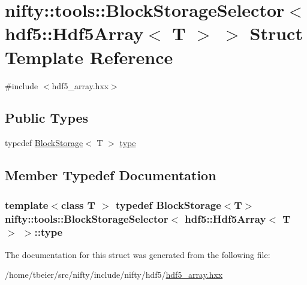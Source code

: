 \hypertarget{structnifty_1_1tools_1_1BlockStorageSelector_3_01hdf5_1_1Hdf5Array_3_01T_01_4_01_4}{}\section{nifty\+:\+:tools\+:\+:Block\+Storage\+Selector$<$ hdf5\+:\+:Hdf5\+Array$<$ T $>$ $>$ Struct Template Reference}
\label{structnifty_1_1tools_1_1BlockStorageSelector_3_01hdf5_1_1Hdf5Array_3_01T_01_4_01_4}


{\ttfamily \#include $<$hdf5\+\_\+array.\+hxx$>$}

\subsection*{Public Types}
\begin{DoxyCompactItemize}
\item 
typedef \hyperlink{classnifty_1_1tools_1_1BlockStorage}{Block\+Storage}$<$ T $>$ \hyperlink{structnifty_1_1tools_1_1BlockStorageSelector_3_01hdf5_1_1Hdf5Array_3_01T_01_4_01_4_a465a6096ba221978bf42a5edbcd0ddd3}{type}
\end{DoxyCompactItemize}


\subsection{Member Typedef Documentation}
\hypertarget{structnifty_1_1tools_1_1BlockStorageSelector_3_01hdf5_1_1Hdf5Array_3_01T_01_4_01_4_a465a6096ba221978bf42a5edbcd0ddd3}{}
\subsubsection[{type}]{\setlength{\rightskip}{0pt plus 5cm}template$<$class T $>$ typedef {\bf Block\+Storage}$<$T$>$ {\bf nifty\+::tools\+::\+Block\+Storage\+Selector}$<$ hdf5\+::\+Hdf5\+Array$<$ T $>$ $>$\+::{\bf type}}\label{structnifty_1_1tools_1_1BlockStorageSelector_3_01hdf5_1_1Hdf5Array_3_01T_01_4_01_4_a465a6096ba221978bf42a5edbcd0ddd3}


The documentation for this struct was generated from the following file\+:\begin{DoxyCompactItemize}
\item 
/home/tbeier/src/nifty/include/nifty/hdf5/\hyperlink{hdf5__array_8hxx}{hdf5\+\_\+array.\+hxx}\end{DoxyCompactItemize}
